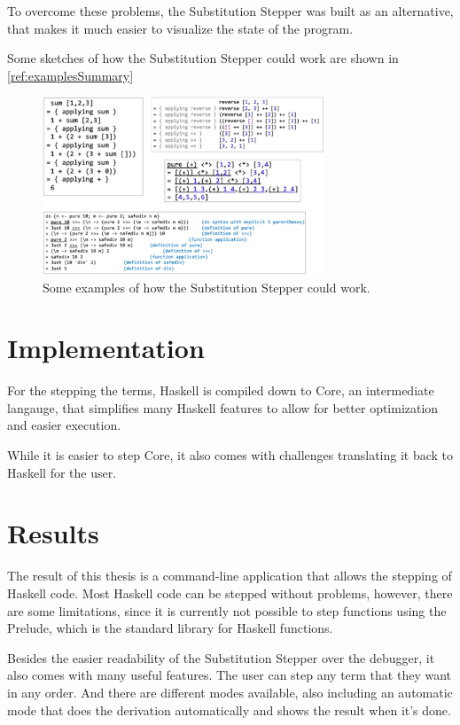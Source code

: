 To overcome these problems,
the Substitution Stepper was built as an alternative,
that makes it much easier to visualize the state of the program.

Some sketches of how the Substitution Stepper could work are shown in \ref*{ref:examplesSummary}

\begin{figure}[!ht]
    \includegraphics[width=0.75\textwidth]{resources/examples.PNG}
    \caption{Some examples of how the Substitution Stepper could work.}
    \label{fig:examplesSummary}
\end{figure}

\section{Implementation}
For the stepping the terms,
Haskell is compiled down to Core,
an intermediate langauge,
that simplifies many Haskell features to allow for better optimization and easier execution.

While it is easier to step Core,
it also comes with challenges translating it back to Haskell for the user.

\section{Results}
The result of this thesis is a command-line application that allows the stepping of Haskell code.
Most Haskell code can be stepped without problems,
however, there are some limitations,
since it is currently not possible to step functions using the Prelude,
which is the standard library for Haskell functions.

Besides the easier readability of the Substitution Stepper over the debugger,
it also comes with many useful features.
The user can step any term that they want in any order.
And there are different modes available,
also including an automatic mode that does the derivation automatically and shows the result when it's done.
